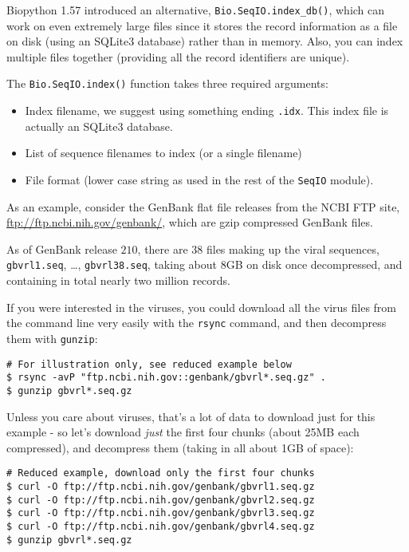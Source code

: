 Biopython 1.57 introduced an alternative, \verb|Bio.SeqIO.index_db()|, which
can work on even extremely large files since it stores the record information
as a file on disk (using an SQLite3 database) rather than in memory. Also,
you can index multiple files together (providing all the record identifiers
are unique).

The \verb|Bio.SeqIO.index()| function takes three required arguments:
\begin{itemize}
\item Index filename, we suggest using something ending \texttt{.idx}.
This index file is actually an SQLite3 database.
\item List of sequence filenames to index (or a single filename)
\item File format (lower case string as used in the rest of the
\verb|SeqIO| module).
\end{itemize}

As an example, consider the GenBank flat file releases from the NCBI FTP site,
\url{ftp://ftp.ncbi.nih.gov/genbank/}, which are gzip compressed GenBank files.

As of GenBank release $210$, there are $38$ files making up the viral sequences,
\texttt{gbvrl1.seq}, \ldots, \texttt{gbvrl38.seq}, taking about 8GB on disk once
decompressed, and containing in total nearly two million records.

If you were interested in the viruses, you could download all the virus files
from the command line very easily with the \texttt{rsync} command, and then
decompress them with \texttt{gunzip}:

\begin{verbatim}
# For illustration only, see reduced example below
$ rsync -avP "ftp.ncbi.nih.gov::genbank/gbvrl*.seq.gz" .
$ gunzip gbvrl*.seq.gz
\end{verbatim}

Unless you care about viruses, that's a lot of data to download just for this
example - so let's download \emph{just} the first four chunks (about 25MB each
compressed), and decompress them (taking in all about 1GB of space):

\begin{verbatim}
# Reduced example, download only the first four chunks
$ curl -O ftp://ftp.ncbi.nih.gov/genbank/gbvrl1.seq.gz
$ curl -O ftp://ftp.ncbi.nih.gov/genbank/gbvrl2.seq.gz
$ curl -O ftp://ftp.ncbi.nih.gov/genbank/gbvrl3.seq.gz
$ curl -O ftp://ftp.ncbi.nih.gov/genbank/gbvrl4.seq.gz
$ gunzip gbvrl*.seq.gz
\end{verbatim}

